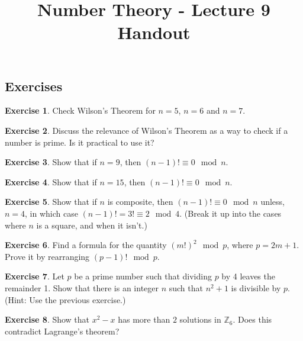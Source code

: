 \documentclass[11pt]{article}
\theoremstyle{definition}
\newtheorem{exercise}{Exercise}
\numberwithin{thm}{section}
\begin{document}
\title{Number Theory - Lecture 9 Handout}

\maketitle


\subsection{Exercises}

\begin{exercise} Check Wilson's Theorem for $n=5$, $n=6$ and $n=7$.
\end{exercise}

\begin{exercise} Discuss the relevance of Wilson's Theorem as a way to check if a number is prime. Is it practical to use it?
\end{exercise}

\begin{exercise} Show that if $n=9$, then $(n-1)! \equiv 0 \mod n$.
\end{exercise}

\begin{exercise} Show that if $n=15$, then $(n-1)! \equiv 0 \mod n$.
\end{exercise}

\begin{exercise} Show that if $n$ is composite, then $(n-1)! \equiv 0 \mod n$ unless, $n=4$, in which case $(n-1)! = 3! \equiv 2 \mod 4$. (Break it up into the cases where $n$ is a square, and when it isn't.)
\end{exercise}

\begin{exercise} Find a formula for the quantity $(m!)^{2} \mod p$, where $p=2m+1$. Prove it by rearranging $(p-1)! \mod p$.
\end{exercise}

\begin{exercise} Let ${p}$ be a prime number such that dividing ${p}$ by 4 leaves the remainder 1. Show that there is an integer ${n}$ such that $n^2 + 1$ is divisible by ${p}$. (Hint: Use the previous exercise.)
\end{exercise}

\begin{exercise} Show that $x^2 - x$ has more than $2$ solutions in $\mathbb{Z}_6$. Does this contradict Lagrange's theorem?
\end{exercise}
\end{document}
